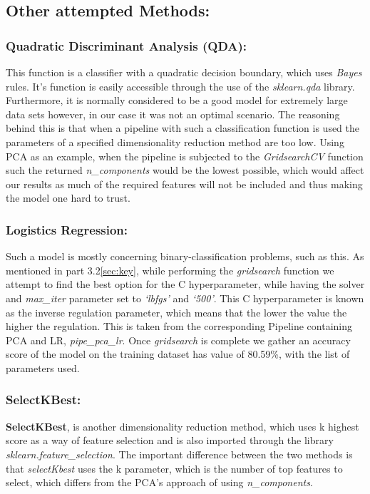 \documentclass{article}
\begin{document}
\subsection{Other attempted Methods:}
\subsubsection{Quadratic Discriminant Analysis (QDA)\cite{qda}:}
This function is a classifier with a quadratic decision boundary, which uses \textit{Bayes} rules. It’s function is easily accessible through the use of the \textit{sklearn.qda} library. Furthermore, it is normally considered to be a good model for extremely large data sets however, in our case it was not an optimal scenario. The reasoning behind this is that when a pipeline with such a classification function is used the parameters of a specified dimensionality reduction method are too low. Using PCA as an example, when the pipeline is subjected to the \textit{GridsearchCV} function such the returned \textit{n\_components} would be the lowest possible, which would affect our results as much of the required features will not be included and thus making the model one hard to trust. 
\subsubsection{Logistics Regression:}
Such a model is mostly concerning binary-classification problems, such as this. As mentioned in part 3.2\ref{sec:key}, while performing the \textit{gridsearch} function we attempt to find the best option for the C hyperparameter, while having the solver and \textit{max\_iter} parameter set to \textit{‘lbfgs’} and \textit{‘500’}. This C hyperparameter is known as the inverse regulation parameter, which means that the lower the value the higher the regulation. This is taken from the corresponding Pipeline containing PCA and LR\cite{lr}, \textit{pipe\_pca\_lr}. Once \textit{gridsearch} is complete we gather an accuracy score of the model on the training dataset has value of 80.59\%, with the list of parameters used.
\subsubsection{SelectKBest\cite{SelectKBest}:}
\textbf{SelectKBest}, is another dimensionality reduction method, which uses k highest score as a way of feature selection and is also imported through the library \textit{sklearn.feature\_selection}. The important difference between the two methods is that \textit{selectKbest} uses the k parameter, which is the number of top features to select, which differs from the PCA’s approach of using \textit{n\_components}. 
\end{document}
